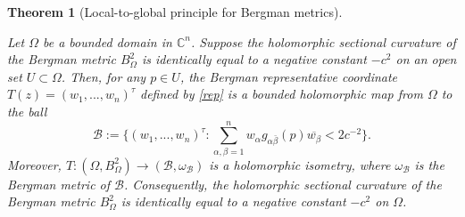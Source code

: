\documentclass[12pt] {article}
\newtheorem{theorem}{Theorem}[section]
\numberwithin{equation}{section}
\begin{document}
      \begin{theorem} [Local-to-global principle for Bergman metrics] \label{nice}


Let $\Omega $ be a bounded  domain in $\mathbb{C}^n$.  
Suppose the holomorphic sectional curvature of the Bergman metric $B^{2}_{\Omega}$ is identically equal to a negative constant $-c^2$ on an open set  $U\subset \Omega $. 
Then, for any $p\in U$, the Bergman representative coordinate $T (z) =(w_1, ... , w_n)^{\tau}$ 
defined by \eqref{rep}  
is a bounded holomorphic map from $ \Omega $ to the ball $$\mathcal B:=\{(w_1, ... , w_n)^{\tau} :   \sum_{\alpha, \beta=1}^n  w_\alpha   g_{ \alpha \bar \beta } (p) \overline {w_\beta }   < {2}{c^{-2}} \}.$$
Moreover, $T: (\Omega, B^{2}_{\Omega}) \to (\mathcal B, \omega_\mathcal B)$ is a holomorphic isometry,   
where  $\omega_\mathcal B$ is the Bergman metric of $\mathcal B$. 
Consequently, the holomorphic sectional curvature of the Bergman metric $B^{2}_{\Omega}$ is identically equal to a negative constant $-c^2$ on $\Omega $. 

  \end{theorem}  


  

 
\end{document}
